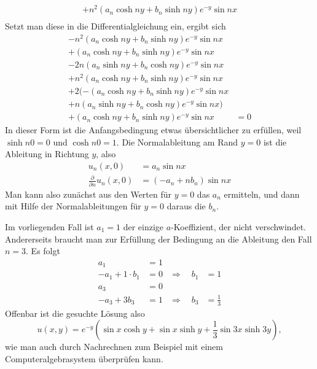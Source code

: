 \begin{loesung}
\begin{align*}
+n^2(a_n\cosh ny+b_n\sinh ny)e^{-y}\sin nx
\\
\end{align*}
Setzt man diese in die Differentialgleichung
ein, ergibt sich
\begin{align*}
-n^2 (a_n\cosh ny+b_n\sinh ny)e^{-y}\sin nx&\\
+(a_n\cosh ny+b_n\sinh ny)e^{-y}\sin nx&\\
-2n(a_n\sinh ny+b_n\cosh ny)e^{-y}\sin nx&\\
+n^2(a_n\cosh ny+b_n\sinh ny)e^{-y}\sin nx&\\
+2(
-(a_n\cosh ny+b_n\sinh ny)e^{-y}\sin nx&\\
+
n(a_n\sinh ny+b_n\cosh ny)e^{-y}\sin nx
)&\\
+
(a_n\cosh ny+b_n\sinh ny)e^{-y}\sin nx
&=0
\end{align*}
In dieser Form ist die Anfangsbedingung etwas übersichtlicher
zu erfüllen, weil  $\sinh n0=0$ und $\cosh n0=1$. Die Normalableitung
am Rand $y=0$ ist die Ableitung in Richtung $y$, also
\begin{align*}
u_n(x,0)&=a_n\sin nx
\\
\frac{\partial}{\partial n}u_n(x,0)&=(-a_n+nb_n)\sin nx
\end{align*}
Man kann also zunächst aus den Werten für $y=0$ das $a_n$
ermitteln, und dann mit Hilfe der Normalableitungen für $y=0$
daraus die $b_n$.

Im vorliegenden Fall ist $a_1=1$ der einzige $a$-Koeffizient,
der nicht verschwindet. Andererseits braucht man zur Erfüllung
der Bedingung an die Ableitung den Fall $n=3$. Es folgt
\begin{align*}
a_1&=1&&\\
-a_1+1\cdot b_1&=0&\Rightarrow\quad b_1&=1\\
a_3&=0&&\\
-a_3+3b_3&=1&\Rightarrow\quad b_3&=\frac13
\end{align*}
Offenbar ist die gesuchte Lösung also
\[
u(x,y)=e^{-y}(\sin x \cosh y +
\sin x\sinh y
+
\frac13\sin 3x \sinh 3y),
\]
wie man auch durch Nachrechnen zum Beispiel mit einem Computeralgebrasystem
überprüfen kann.
\end{loesung}

